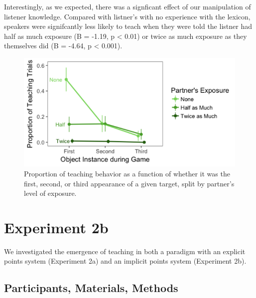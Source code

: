 \documentclass[10pt, letterpaper]{article}
\newenvironment{CodeChunk}{}{}
\begin{document}
Interestingly, as we expected, there was a signficant effect of our
manipulation of listener knowledge. Compared with listner's with no
experience with the lexicon, speakers were signifcantly less likely to
teach when they were told the listner had half as much exposure (B =
-1.19, p \textless{} 0.01) or twice as much exposure as they themselves
did (B = -4.64, p \textless{} 0.001).

\begin{CodeChunk}
\begin{figure}[H]

{\centering \includegraphics{figs/image3-1} 

}

\caption[Proportion of teaching behavior as a function of whether it was the first, second, or third appearance of a given target, split by partner's level of exposure]{Proportion of teaching behavior as a function of whether it was the first, second, or third appearance of a given target, split by partner's level of exposure.}\label{fig:image3}
\end{figure}
\end{CodeChunk}

\section{Experiment 2b}\label{experiment-2b}

We investigated the emergence of teaching in both a paradigm with an
explicit points system (Experiment 2a) and an implicit points system
(Experiment 2b).

\subsection{Participants, Materials,
Methods}\label{participants-materials-methods-3}
\end{document}
